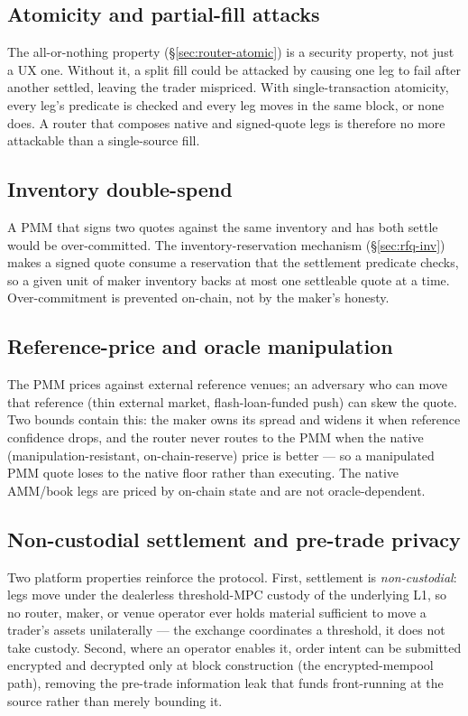 \subsection{Atomicity and partial-fill attacks}

The all-or-nothing property (\S\ref{sec:router-atomic}) is a security
property, not just a UX one. Without it, a split fill could be attacked by
causing one leg to fail after another settled, leaving the trader
mispriced. With single-transaction atomicity, every leg's predicate is
checked and every leg moves in the same block, or none does. A router that
composes native and signed-quote legs is therefore no more attackable than
a single-source fill.

\subsection{Inventory double-spend}

A PMM that signs two quotes against the same inventory and has both settle
would be over-committed. The inventory-reservation mechanism
(\S\ref{sec:rfq-inv}) makes a signed quote consume a reservation that the
settlement predicate checks, so a given unit of maker inventory backs at
most one settleable quote at a time. Over-commitment is prevented on-chain,
not by the maker's honesty.

\subsection{Reference-price and oracle manipulation}

The PMM prices against external reference venues; an adversary who can move
that reference (thin external market, flash-loan-funded push) can skew the
quote. Two bounds contain this: the maker owns its spread and widens it when
reference confidence drops, and the router never routes to the PMM when the
native (manipulation-resistant, on-chain-reserve) price is better --- so a
manipulated PMM quote loses to the native floor rather than executing. The
native AMM/book legs are priced by on-chain state and are not oracle-dependent.

\subsection{Non-custodial settlement and pre-trade privacy}

Two platform properties reinforce the protocol. First, settlement is
\emph{non-custodial}: legs move under the dealerless threshold-MPC custody
of the underlying L1, so no router, maker, or venue operator ever holds
material sufficient to move a trader's assets unilaterally --- the exchange
coordinates a threshold, it does not take custody. Second, where an operator
enables it, order intent can be submitted encrypted and decrypted only at
block construction (the encrypted-mempool path), removing the pre-trade
information leak that funds front-running at the source rather than merely
bounding it.

